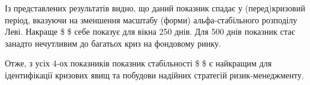 \documentclass[
  letterpaper,
]{report}
\begin{document}
Із представлених результатів видно, що даний показник спадає у
(перед)кризовий період, вказуючи на зменшення масштабу (форми)
альфа-стабільного розподілу Леві. Накраще \$ \sigma \$ себе показує для
вікна 250 днів. Для 500 днів показник стає занадто нечутливим до
багатьох криз на фондовому ринку.

Отже, з усіх 4-ох показників показник стабільності \$ \alpha \$ є
найкращим для ідентифікації кризових явищ та побудови надійних стратегій
ризик-менеджменту.
\end{document}
